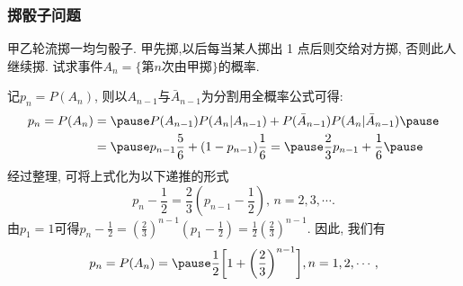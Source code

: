 \documentclass[Prob-All.tex]{subfiles}
\begin{document}
%
%
%






\begin{frame}
  \frametitle{掷骰子问题}
  \begin{exam}
   甲乙轮流掷一均匀骰子. 甲先掷,以后每当某人掷出 1 点后则交给对方掷, 否则此人继续掷. 试求事件$A_n=\{\mbox{第}n\mbox{次由甲掷}\}$的概率.
  \end{exam}

  \pause
\jieda 记$p_n=P(A_n)$, 则以$A_{n-1}$与$\bar{A}_{n-1}$为分割用全概率公式可得:\pause
\begin{align*}
  p_n=P(A_n)&=\pause P(A_{n-1})P(A_n|A_{n-1})+P(\bar{A}_{n-1})P(A_n|\bar{A}_{n-1})\pause\\
            &=\pause p_{n-1}\dfrac{5}{6}+(1-p_{n-1})\dfrac{1}{6}=\pause \dfrac{2}{3}p_{n-1}+\dfrac{1}{6}\pause
\end{align*}
 经过整理, 可将上式化为以下递推的形式\pause
$$p_n-\frac{1}{2}=\frac{2}{3}\left(p_{n-1}-\frac{1}{2}\right),\,n=2,3,\cdots.$$\pause
由$p_1=1$可得$p_n-\frac{1}{2}=\left(\frac{2}{3}\right)^{n-1}\left(p_1-\frac{1}{2}\right)=\frac{1}{2}\left(\frac{2}{3}\right)^{n-1}.$
\pause 因此, 我们有\pause
\begin{eqnarray*}
  p_n=P(A_n)=\pause\dfrac{1}{2}\bigg[1+\bigg(\dfrac{2}{3}\bigg)^{n-1}\bigg], n=1,2, \cdots,
\end{eqnarray*}

\end{frame}
\end{document}

